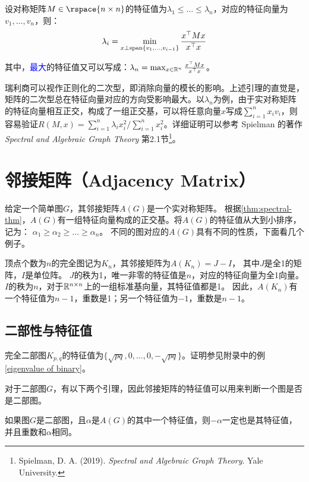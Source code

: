 \begin{lemma}
\label{lem:rayleigh}
    设对称矩阵$M\in\rspace{n\times n}$的特征值为$\lambda_1\leq\dots\leq\lambda_n$，对应的特征向量为$v_1,\dots,v_n$，则：
    \[\lambda_i=\min_{x\perp\mathrm{span}\{v_{1},\dots,v_{i-1}\}}\frac{{x}^{\top}{M}{x}}{{x}^{\top}{}{x}}\]

    其中，\textcolor{blue}{最大}的特征值又可以写成：$\lambda_n=\max_{x\in\mathbb{R}^n}\frac{{x}^{\top}{M}{x}}{{x}^{\top}{}{x}}$。
\end{lemma}

瑞利商可以视作正则化的二次型，即消除向量的模长的影响。上述引理的直觉是，矩阵的二次型总在特征向量对应的方向受影响最大。以$\lambda_n$为例，由于实对称矩阵的特征向量相互正交，构成了一组正交基，可以将任意向量$x$写成$\sum_{i=1}^nx_iv_i$，则容易验证$R(M,x)=\sum_{i=1}^n\lambda_ix_i^2/\sum_{i=1}^nx_i^2$。详细证明可以参考 Spielman 的著作 \textit{Spectral and Algebraic Graph Theory} 第2.1节\footnote{Spielman, D. A. (2019). \textit{Spectral and Algebraic Graph Theory}. Yale University.}。

\section{邻接矩阵（Adjacency Matrix）}
给定一个简单图$G$，其邻接矩阵$A(G)$是一个实对称矩阵。
根据\cref{thm:spectral-thm}，$A(G)$有一组特征向量构成的正交基。将$A(G)$的特征值从大到小排序，记为：
$\alpha_1\ge\alpha_2\ge\dots\ge\alpha_n$。
不同的图对应的$A(G)$具有不同的性质，下面看几个例子。

\example 顶点个数为$n$的完全图记为$K_n$，其邻接矩阵为$A(K_n)=J-I$，
其中$J$是全1的矩阵，$I$是单位阵。
$J$的秩为1，唯一非零的特征值是$n$，对应的特征向量为全1向量。
$I$的秩为$n$，对于$\mathbb{R}^{n\times n}$上的一组标准基向量，其特征值都是1。
因此，$A(K_n)$有一个特征值为$n-1$，重数是1；另一个特征值为$-1$，重数是$n-1$。
\subsection{二部性与特征值}

\example 完全二部图$K_{p,q}$的特征值为$\{\sqrt{pq},0,\ldots,0,-\sqrt{pq}\}$。证明参见附录中的例\ref{eigenvalue of binary}。


\example 对于二部图$G$，有以下两个引理，因此邻接矩阵的特征值可以用来判断一个图是否是二部图。

\begin{lemma}\label{lem:bipartite-1}
    如果图$G$是二部图，且$\alpha$是$A(G)$的其中一个特征值，则$-\alpha$一定也是其特征值，并且重数和$\alpha$相同。
\end{lemma}


